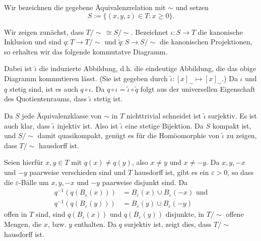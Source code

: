 \documentclass[a4paper,10pt]{article}
\begin{document}
Wir bezeichnen die gegebene Äquivalenzrelation mit $\sim$ und setzen
\[
 S := \{(x,y,z) \in T : x \geq 0\}.
\]

Wir zeigen zunächst, dass $T/\!\sim\, \cong S/\!\sim$. Bezeichnet $\iota : S \to T$ die kanonische Inklusion und sind $q : T \to T/\sim$ und $\tilde{q} : S \to S/\sim$ die kanonischen Projektionen, so erhalten wir das folgende kommutatve Diagramm.
 \begin{center}
 \end{center}
Dabei ist $\tilde{\iota}$ die induzierte Abbildung, d.h. die eindeutige Abbildung, die das obige Diagramm kommutieren lässt. (Sie ist gegeben durch $\tilde{\iota} : [x]_\sim \mapsto [x]_\sim$.) Da $\iota$ und $q$ stetig sind, ist es auch $q \circ \iota$. Da $q \circ \iota = \tilde{\iota} \circ \tilde{q}$ folgt aus der universellen Eigenschaft des Quotientenraums, dass $\tilde{\iota}$ stetig ist.

Da $S$ jede Äquivalenzklasse von $\sim$ in $T$ nichttrivial schneidet ist $\tilde{\iota}$ surjektiv. Es ist auch klar, dass $\tilde{\iota}$ injektiv ist. Also ist $\tilde{\iota}$ eine stetige Bijektion. Da $S$ kompakt ist, und $S/\sim$ damit quasikompakt, genügt es für die Homöomorphie von $\tilde{\iota}$ zu zeigen, dass $T/\sim$ hausdorff ist.

Seien hierfür $x,y \in T$ mit $q(x) \neq q(y)$, also $x \neq y$ und $x \neq -y$. Da $x, y, -x$ und $-y$ paarweise verschieden sind und $T$ hausdorff ist, gibt es ein $\varepsilon > 0$, so dass die $\varepsilon$-Bälle um $x, y, -x$ und $-y$ paarweise disjunkt sind. Da
\begin{align*}
 q^{-1}(q(B_\varepsilon(x))) &= B_\varepsilon(x) \cup B_\varepsilon(-x) \text{ und} \\
 q^{-1}(q(B_\varepsilon(y))) &= B_\varepsilon(y) \cup B_\varepsilon(-y) 
\end{align*}
offen in $T$ sind, sind $q(B_\varepsilon(x))$ und $q(B_\varepsilon(y))$ disjunkte, in $T/\sim$ offene Mengen, die $x$, bzw. $y$ enthalten. Da $q$ surjektiv ist, zeigt dies, dass $T/\sim$ hausdorff ist.
\end{document}
